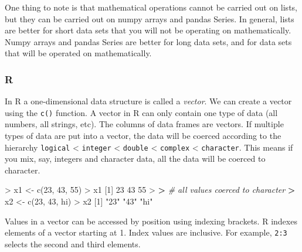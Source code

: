 \documentclass[
]{book}
\newenvironment{Shaded}{\begin{snugshade}}{\end{snugshade}}
\newcommand{\CommentTok}[1]{\textcolor[rgb]{0.56,0.35,0.01}{\textit{#1}}}
\newcommand{\DecValTok}[1]{\textcolor[rgb]{0.00,0.00,0.81}{#1}}
\newcommand{\ErrorTok}[1]{\textcolor[rgb]{0.64,0.00,0.00}{\textbf{#1}}}
\newcommand{\FunctionTok}[1]{\textcolor[rgb]{0.00,0.00,0.00}{#1}}
\newcommand{\NormalTok}[1]{#1}
\newcommand{\OtherTok}[1]{\textcolor[rgb]{0.56,0.35,0.01}{#1}}
\newcommand{\SpecialCharTok}[1]{\textcolor[rgb]{0.00,0.00,0.00}{#1}}
\newcommand{\StringTok}[1]{\textcolor[rgb]{0.31,0.60,0.02}{#1}}
\begin{document}
One thing to note is that mathematical operations cannot be carried out on lists, but they can be carried out on numpy arrays and pandas Series. In general, lists are better for short data sets that you will not be operating on mathematically. Numpy arrays and pandas Series are better for long data sets, and for data sets that will be operated on mathematically.

\hypertarget{r-8}{%
\subsubsection*{R}\label{r-8}}

In R a one-dimensional data structure is called a \emph{vector}. We can create a vector using the \texttt{c()} function. A vector in R can only contain one type of data (all numbers, all strings, etc). The columns of data frames are vectors. If multiple types of data are put into a vector, the data will be coerced according to the hierarchy \texttt{logical} \textless{} \texttt{integer} \textless{} \texttt{double} \textless{} \texttt{complex} \textless{} \texttt{character}. This means if you mix, say, integers and character data, all the data will be coerced to character.

\begin{Shaded}
\begin{Highlighting}[]
\SpecialCharTok{\textgreater{}}\NormalTok{ x1 }\OtherTok{\textless{}{-}} \FunctionTok{c}\NormalTok{(}\DecValTok{23}\NormalTok{, }\DecValTok{43}\NormalTok{, }\DecValTok{55}\NormalTok{)}
\SpecialCharTok{\textgreater{}}\NormalTok{ x1}
\NormalTok{[}\DecValTok{1}\NormalTok{] }\DecValTok{23} \DecValTok{43} \DecValTok{55}
\SpecialCharTok{\textgreater{}} 
\ErrorTok{\textgreater{}} \CommentTok{\# all values coerced to character}
\ErrorTok{\textgreater{}}\NormalTok{ x2 }\OtherTok{\textless{}{-}} \FunctionTok{c}\NormalTok{(}\DecValTok{23}\NormalTok{, }\DecValTok{43}\NormalTok{, }\StringTok{\textquotesingle{}hi\textquotesingle{}}\NormalTok{)}
\SpecialCharTok{\textgreater{}}\NormalTok{ x2}
\NormalTok{[}\DecValTok{1}\NormalTok{] }\StringTok{"23"} \StringTok{"43"} \StringTok{"hi"}
\end{Highlighting}
\end{Shaded}

Values in a vector can be accessed by position using indexing brackets. R indexes elements of a vector starting at 1. Index values are inclusive. For example, \texttt{2:3} selects the second and third elements.
\end{document}
